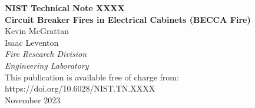 \documentclass[12pt]{article}
\newcommand{\pubnumber}{XXXX}
\newcommand{\DOI}{https://doi.org/10.6028/NIST.TN.XXXX}
\newcommand{\monthyear}{November 2023}
\begin{document}
\begin{titlepage}
\begin{flushright}
\LARGE{\textbf{NIST Technical Note \pubnumber}}\\
\vfill
\Huge{\textbf{Circuit \textbf{B}reaker Fires in \textbf{E}lectrical \textbf{C}abinets (BECCA Fire)}}\\
\vfill
\normalsize Kevin McGrattan \\ Isaac Leventon \\
\textit{Fire Research Division}\\
\textit{Engineering Laboratory}\\
\vfill
\normalsize This publication is available free of charge from:\\
\DOI\\
\vfill
\normalsize \monthyear
\vfill


\end{flushright}
\end{titlepage}
\end{document}
